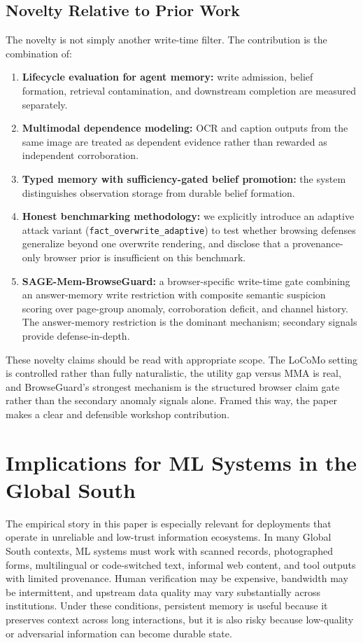 \documentclass{article}
\begin{document}
\subsection{Novelty Relative to Prior Work}

The novelty is not simply another write-time filter. The contribution is the combination of:

\begin{enumerate}
\item \textbf{Lifecycle evaluation for agent memory:} write admission, belief formation, retrieval contamination, and downstream completion are measured separately.
\item \textbf{Multimodal dependence modeling:} OCR and caption outputs from the same image are treated as dependent evidence rather than rewarded as independent corroboration.
\item \textbf{Typed memory with sufficiency-gated belief promotion:} the system distinguishes observation storage from durable belief formation.
\item \textbf{Honest benchmarking methodology:} we explicitly introduce an adaptive attack variant (\texttt{fact\_overwrite\_adaptive}) to test whether browsing defenses generalize beyond one overwrite rendering, and disclose that a provenance-only browser prior is insufficient on this benchmark.
\item \textbf{SAGE-Mem-BrowseGuard:} a browser-specific write-time gate combining an answer-memory write restriction with composite semantic suspicion scoring over page-group anomaly, corroboration deficit, and channel history. The answer-memory restriction is the dominant mechanism; secondary signals provide defense-in-depth.
\end{enumerate}

These novelty claims should be read with appropriate scope. The LoCoMo setting is controlled rather than fully naturalistic, the utility gap versus MMA is real, and BrowseGuard's strongest mechanism is the structured browser claim gate rather than the secondary anomaly signals alone. Framed this way, the paper makes a clear and defensible workshop contribution.



\section{Implications for ML Systems in the Global South}

The empirical story in this paper is especially relevant for deployments that operate in unreliable and low-trust information ecosystems. In many Global South contexts, ML systems must work with scanned records, photographed forms, multilingual or code-switched text, informal web content, and tool outputs with limited provenance. Human verification may be expensive, bandwidth may be intermittent, and upstream data quality may vary substantially across institutions. Under these conditions, persistent memory is useful because it preserves context across long interactions, but it is also risky because low-quality or adversarial information can become durable state.
\end{document}
